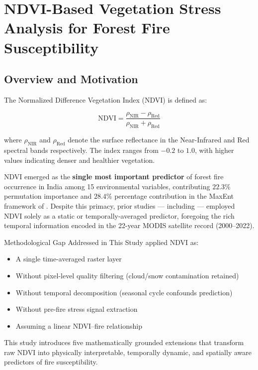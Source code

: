 \documentclass[12pt, a4paper]{article}
\begin{document}
\section{NDVI-Based Vegetation Stress Analysis for Forest Fire
         Susceptibility}
\label{sec:ndvi_methodology}

\subsection{Overview and Motivation}
\label{sec:overview}

The Normalized Difference Vegetation Index (NDVI) is defined as:

\begin{equation}
    \text{NDVI} = \frac{\rho_{\text{NIR}} - \rho_{\text{Red}}}
                       {\rho_{\text{NIR}} + \rho_{\text{Red}}}
    \label{eq:ndvi_definition}
\end{equation}

where $\rho_{\text{NIR}}$ and $\rho_{\text{Red}}$ denote the surface
reflectance in the Near-Infrared and Red spectral bands respectively.
The index ranges from $-0.2$ to $1.0$, with higher values indicating
denser and healthier vegetation.

NDVI emerged as the \textbf{single most important predictor} of forest
fire occurrence in India among 15 environmental variables, contributing
$22.3\%$ permutation importance and $28.4\%$ percentage contribution
in the MaxEnt framework of \citet{biswas2025}. Despite this primacy,
prior studies — including \citet{biswas2025} — employed NDVI solely as a
static or temporally-averaged predictor, foregoing the rich temporal
information encoded in the 22-year MODIS satellite record (2000--2022).

\begin{novelbox}{Methodological Gap Addressed in This Study}
\citet{biswas2025} applied NDVI as:
\begin{itemize}[leftmargin=1.5em]
    \item A single time-averaged raster layer
    \item Without pixel-level quality filtering (cloud/snow contamination retained)
    \item Without temporal decomposition (seasonal cycle confounds prediction)
    \item Without pre-fire stress signal extraction
    \item Assuming a linear NDVI--fire relationship
\end{itemize}
This study introduces five mathematically grounded extensions that
transform raw NDVI into physically interpretable, temporally dynamic,
and spatially aware predictors of fire susceptibility.
\end{novelbox}
\end{document}
